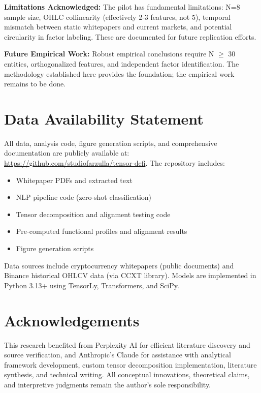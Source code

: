 \documentclass[11pt,twocolumn]{article}
\begin{document}
\textbf{Limitations Acknowledged:} The pilot has fundamental limitations: N=8 sample size, OHLC collinearity (effectively 2-3 features, not 5), temporal mismatch between static whitepapers and current markets, and potential circularity in factor labeling. These are documented for future replication efforts.

\textbf{Future Empirical Work:} Robust empirical conclusions require N $\geq$ 30 entities, orthogonalized features, and independent factor identification. The methodology established here provides the foundation; the empirical work remains to be done.

\clearpage
\onecolumn
{}  %


\section*{Data Availability Statement}

All data, analysis code, figure generation scripts, and comprehensive documentation are publicly available at: \url{https://github.com/studiofarzulla/tensor-defi}. The repository includes:

\begin{itemize}[leftmargin=*]
    \item Whitepaper PDFs and extracted text
    \item NLP pipeline code (zero-shot classification)
    \item Tensor decomposition and alignment testing code
    \item Pre-computed functional profiles and alignment results
    \item Figure generation scripts
\end{itemize}

Data sources include cryptocurrency whitepapers (public documents) and Binance historical OHLCV data (via CCXT library). Models are implemented in Python 3.13+ using TensorLy, Transformers, and SciPy.

\section*{Acknowledgements}

This research benefited from Perplexity AI for efficient literature discovery and source verification, and Anthropic's Claude for assistance with analytical framework development, custom tensor decomposition implementation, literature synthesis, and technical writing. All conceptual innovations, theoretical claims, and interpretive judgments remain the author's sole responsibility.
\end{document}
